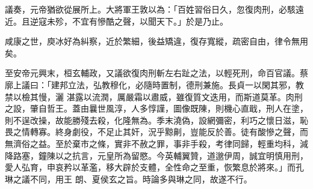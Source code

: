 \begin{pinyinscope}
 議奏，元帝猶欲從展所上。大將軍王敦以為：「百姓習俗日久，忽復肉刑，必駭遠近。且逆寇未殄，不宜有慘酷之聲，以聞天下。」於是乃止。



 咸康之世，庾冰好為糾察，近於繁細，後益矯違，復存寬縱，疏密自由，律令無用矣。



 至安帝元興末，桓玄輔政，又議欲復肉刑斬左右趾之法，以輕死刑，命百官議。蔡廓上議曰：「建邦立法，弘教穆化，必隨時置制，德刑兼施。長貞一以閑其邪，教禁以檢其慢，灑
 湛露以流潤，厲嚴霜以肅威，雖復質文迭用，而斯道莫革。肉刑之設，肇自哲王。蓋由曩世風淳，人多惇謹，圖像既陳，則機心直戢，刑人在塗，則不逞改操，故能勝殘去殺，化隆無為。季末澆偽，設網彌密，利巧之懷日滋，恥畏之情轉寡。終身劇役，不足止其奸，況乎黥劓，豈能反於善。徒有酸慘之聲，而無濟俗之益。至於棄市之條，實非不赦之罪，事非手殺，考律同歸，輕重均科，減降路塞，鐘陳以之抗言，元皇所為留愍。今英輔翼贊，道邈伊周，誠宜明慎用刑，愛人弘育，申哀矜以革濫，移大辟於支體，全性命之至重，恢繁息於將來。」而孔琳之議不同，用王
 朗、夏侯玄之旨。時論多與琳之同，故遂不行。



\end{pinyinscope}